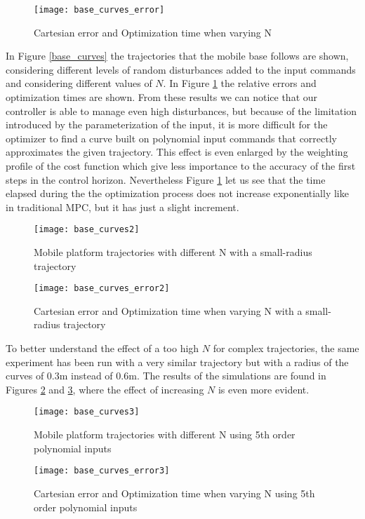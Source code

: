 \begin{figure}[!h]
\texttt{[image: base\_curves\_error]}
\centering
\caption{Cartesian error and Optimization time when varying N}
\label{base_curves_errors}
\end{figure}
In Figure \ref{base_curves} the trajectories that the mobile base follows are shown, considering different levels of random disturbances added to the input commands and considering different values of $N$. In Figure \ref{base_curves_errors} the relative errors and optimization times are shown. From these results we can notice that our controller is able to manage even high disturbances, but because of the limitation introduced by the parameterization of the input, it is more difficult for the optimizer to find a curve built on polynomial input commands that correctly approximates the given trajectory. This effect is even enlarged by the weighting profile of the cost function which give less importance to the accuracy of the first steps in the control horizon. Nevertheless Figure \ref{base_curves_errors} let us see that the time elapsed during the the optimization process does not increase exponentially like in traditional MPC, but it has just a slight increment.\\
\begin{figure}[p]
\centering
\texttt{[image: base\_curves2]}
\caption{Mobile platform trajectories with different N with a small-radius trajectory}
\label{base_curves2}
\end{figure}
\begin{figure}[p]
\texttt{[image: base\_curves\_error2]}
\centering
\caption{Cartesian error and Optimization time when varying N with a small-radius trajectory}
\label{base_curves_errors2}
\end{figure}
To better understand the effect of a too high $N$ for complex trajectories, the same experiment has been run with a very similar trajectory but with a radius of the curves of $0.3$m instead of $0.6$m. The results of the simulations are found in Figures \ref{base_curves2} and \ref{base_curves_errors2}, where the effect of increasing $N$ is even more evident.
\begin{figure}[p]
\centering
\texttt{[image: base\_curves3]}
\caption{Mobile platform trajectories with different N using 5th order polynomial inputs}
\label{base_curves3}
\end{figure}
\begin{figure}[p]
\texttt{[image: base\_curves\_error3]}
\centering
\caption{Cartesian error and Optimization time when varying N using 5th order polynomial inputs}
\label{base_curves_errors3}
\end{figure}
